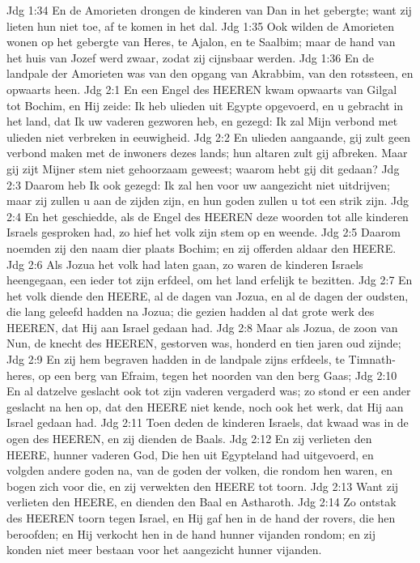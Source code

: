 Jdg 1:34  En de Amorieten drongen de kinderen van Dan in het gebergte; want zij lieten hun niet toe, af te komen in het dal.
Jdg 1:35  Ook wilden de Amorieten wonen op het gebergte van Heres, te Ajalon, en te Saalbim; maar de hand van het huis van Jozef werd zwaar, zodat zij cijnsbaar werden.
Jdg 1:36  En de landpale der Amorieten was van den opgang van Akrabbim, van den rotssteen, en opwaarts heen.
Jdg 2:1  En een Engel des HEEREN kwam opwaarts van Gilgal tot Bochim, en Hij zeide: Ik heb ulieden uit Egypte opgevoerd, en u gebracht in het land, dat Ik uw vaderen gezworen heb, en gezegd: Ik zal Mijn verbond met ulieden niet verbreken in eeuwigheid.
Jdg 2:2  En ulieden aangaande, gij zult geen verbond maken met de inwoners dezes lands; hun altaren zult gij afbreken. Maar gij zijt Mijner stem niet gehoorzaam geweest; waarom hebt gij dit gedaan?
Jdg 2:3  Daarom heb Ik ook gezegd: Ik zal hen voor uw aangezicht niet uitdrijven; maar zij zullen u aan de zijden zijn, en hun goden zullen u tot een strik zijn.
Jdg 2:4  En het geschiedde, als de Engel des HEEREN deze woorden tot alle kinderen Israels gesproken had, zo hief het volk zijn stem op en weende.
Jdg 2:5  Daarom noemden zij den naam dier plaats Bochim; en zij offerden aldaar den HEERE.
Jdg 2:6  Als Jozua het volk had laten gaan, zo waren de kinderen Israels heengegaan, een ieder tot zijn erfdeel, om het land erfelijk te bezitten.
Jdg 2:7  En het volk diende den HEERE, al de dagen van Jozua, en al de dagen der oudsten, die lang geleefd hadden na Jozua; die gezien hadden al dat grote werk des HEEREN, dat Hij aan Israel gedaan had.
Jdg 2:8  Maar als Jozua, de zoon van Nun, de knecht des HEEREN, gestorven was, honderd en tien jaren oud zijnde;
Jdg 2:9  En zij hem begraven hadden in de landpale zijns erfdeels, te Timnath-heres, op een berg van Efraim, tegen het noorden van den berg Gaas;
Jdg 2:10  En al datzelve geslacht ook tot zijn vaderen vergaderd was; zo stond er een ander geslacht na hen op, dat den HEERE niet kende, noch ook het werk, dat Hij aan Israel gedaan had.
Jdg 2:11  Toen deden de kinderen Israels, dat kwaad was in de ogen des HEEREN, en zij dienden de Baals.
Jdg 2:12  En zij verlieten den HEERE, hunner vaderen God, Die hen uit Egypteland had uitgevoerd, en volgden andere goden na, van de goden der volken, die rondom hen waren, en bogen zich voor die, en zij verwekten den HEERE tot toorn.
Jdg 2:13  Want zij verlieten den HEERE, en dienden den Baal en Astharoth.
Jdg 2:14  Zo ontstak des HEEREN toorn tegen Israel, en Hij gaf hen in de hand der rovers, die hen beroofden; en Hij verkocht hen in de hand hunner vijanden rondom; en zij konden niet meer bestaan voor het aangezicht hunner vijanden.
